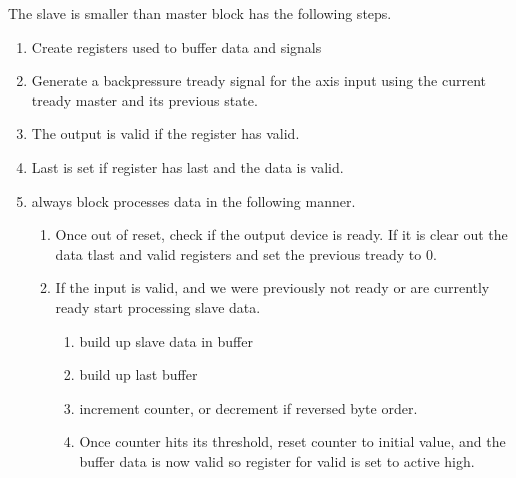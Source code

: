 \par
The slave is smaller than master block has the following steps.
\begin{enumerate}
\item Create registers used to buffer data and signals
\item Generate a backpressure tready signal for the axis input using the current tready master and its previous state.
\item The output is valid if the register has valid.
\item Last is set if register has last and the data is valid.
\item always block processes data in the following manner.
  \begin{enumerate}
    \item Once out of reset, check if the output device is ready. If it is clear out the data tlast and valid registers and set the previous tready to 0.
    \item If the input is valid, and we were previously not ready or are currently ready start processing slave data.
    \begin{enumerate}
      \item build up slave data in buffer
      \item build up last buffer
      \item increment counter, or decrement if reversed byte order.
      \item Once counter hits its threshold, reset counter to initial value, and the buffer data is now valid so register for valid is set to active high.
    \end{enumerate}
  \end{enumerate}
\end{enumerate}

